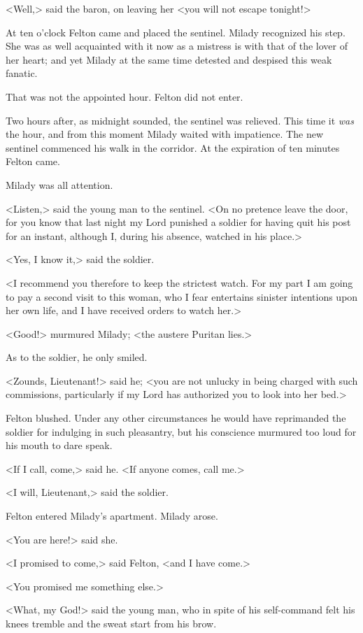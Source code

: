 <Well,> said the baron, on leaving her <you will not escape tonight!> 

At ten o'clock Felton came and placed the sentinel. Milady recognized his step. She was as well acquainted with it now as a mistress is with that of the lover of her heart; and yet Milady at the same time detested and despised this weak fanatic. 

That was not the appointed hour. Felton did not enter. 

Two hours after, as midnight sounded, the sentinel was relieved. This time it \emph{was} the hour, and from this moment Milady waited with impatience. The new sentinel commenced his walk in the corridor. At the expiration of ten minutes Felton came. 

Milady was all attention. 

<Listen,> said the young man to the sentinel. <On no pretence leave the door, for you know that last night my Lord punished a soldier for having quit his post for an instant, although I, during his absence, watched in his place.> 

<Yes, I know it,> said the soldier. 

<I recommend you therefore to keep the strictest watch. For my part I am going to pay a second visit to this woman, who I fear entertains sinister intentions upon her own life, and I have received orders to watch her.> 

<Good!> murmured Milady; <the austere Puritan lies.> 

As to the soldier, he only smiled. 

<Zounds, Lieutenant!> said he; <you are not unlucky in being charged with such commissions, particularly if my Lord has authorized you to look into her bed.> 

Felton blushed. Under any other circumstances he would have reprimanded the soldier for indulging in such pleasantry, but his conscience murmured too loud for his mouth to dare speak. 

<If I call, come,> said he. <If anyone comes, call me.> 

<I will, Lieutenant,> said the soldier. 

Felton entered Milady's apartment. Milady arose. 

<You are here!> said she. 

<I promised to come,> said Felton, <and I have come.> 

<You promised me something else.> 

<What, my God!> said the young man, who in spite of his self-command felt his knees tremble and the sweat start from his brow. 

